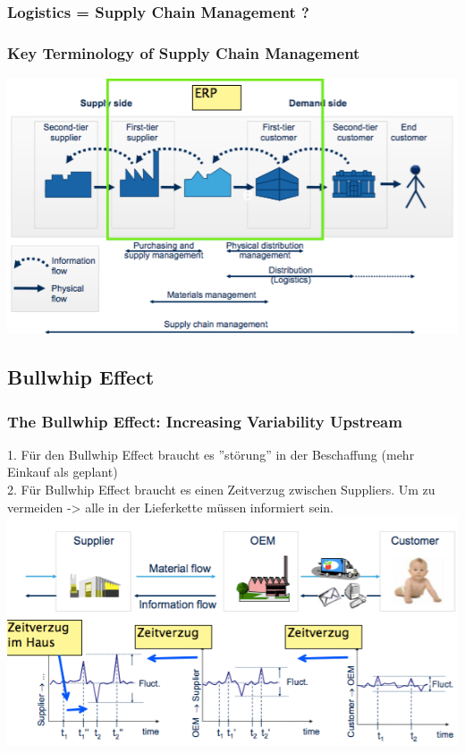 \subsubsection{Logistics = Supply Chain Management ?}
\subsubsection{Key Terminology of Supply Chain Management}
\includegraphics[width=1\textwidth]{W08/keyterm}
\subsection{Bullwhip Effect}
\subsubsection{The Bullwhip Effect: Increasing Variability Upstream}
1. F\"ur den Bullwhip Effect braucht es ''st\"orung'' in der Beschaffung (mehr Einkauf als geplant)\\
2. F\"ur Bullwhip Effect braucht es einen Zeitverzug zwischen Suppliers.
Um zu vermeiden -> alle in der Lieferkette m\"ussen informiert sein.
\includegraphics[width=1\textwidth]{W08/variabilityupstream}
